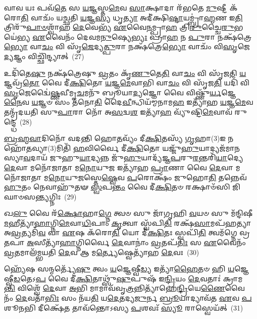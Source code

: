 𑌵𑌾𑌵 𑌯𑌃 𑌪𑌵᳴\-\ul{𑌤𑍇} 𑌸 \ul{𑌯}\-𑌜𑍍𑌞𑌸𑍍𑌤\-\ul{𑌮𑍇}\-𑌵 \ul{𑌸𑌾}\-𑌕𑍍𑌷𑌾𑌦𑌾 𑌰᳴𑌭𑌤𑍇 \ul{𑌮𑍁}\-𑌷𑍍𑌟𑍀 𑌕᳴𑌰𑍋\-\ul{𑌤𑌿} 𑌵𑌾𑌚𑌂᳴ 𑌯𑌚𑍍𑌛𑌤𑌿 \ul{𑌯}\-𑌜𑍍𑌞\-\ul{𑌸𑍍𑌯} 𑌧𑍃\-\ul{𑌤𑍍𑌯𑌾} 𑌅𑌦𑍀॑𑌕𑍍𑌷𑌿\-\ul{𑌷𑍍𑌟𑌾}\-𑌯𑌮𑍍𑌬𑍍𑌰𑌾॑\-\ul{𑌹𑍍𑌮}\-𑌣 𑌇\-\ul{𑌤𑌿} 𑌤𑍍𑌰𑌿𑌰𑍁᳴\-\ul{𑌪𑌾}\-\-\ul{𑍞}\-𑌶𑍍𑌵𑌾᳴𑌹 \ul{𑌦𑍇}\-𑌵𑍇𑌭𑍍𑌯᳴ \ul{𑌏}\-𑌵𑍈\-\ul{𑌨}\-𑌮𑍍𑌪𑍍𑌰𑌾\-\ul{𑌹} 𑌤𑍍𑌰𑌿\-\ul{𑌰𑍁}\-𑌚𑍍𑌚𑍈\-\ul{𑌰𑍁}\-𑌭𑌯𑍇॑𑌭𑍍𑌯 \ul{𑌏}\-𑌵𑍈𑌨𑌂᳴ 𑌦𑍇𑌵𑌮\-\ul{𑌨𑍁}\-𑌷𑍍𑌯𑍇\-\ul{𑌭𑍍𑌯𑌃} 𑌪𑍍𑌰𑌾\-\ul{𑌹} 𑌨 \ul{𑌪𑍁}\-𑌰𑌾 𑌨𑌕𑍍𑌷᳴𑌤𑍍𑌰𑍇\-\ul{𑌭𑍍𑌯𑍋} 𑌵𑌾\-\ul{𑌚𑌂} 𑌵𑌿 𑌸𑍃᳴\-\ul{𑌜𑍇}\-𑌦𑍍𑌯\-\ul{𑌤𑍍𑌪𑍁}\-𑌰𑌾 𑌨𑌕𑍍𑌷᳴𑌤𑍍𑌰𑍇\-\ul{𑌭𑍍𑌯𑍋} 𑌵𑌾𑌚𑌂᳴ 𑌵𑌿\-\ul{𑌸𑍃}\-𑌜𑍇\-\ul{𑌦𑍍𑌯}\-𑌜𑍍𑌞𑌂 𑌵𑌿𑌚𑍍𑌛𑌿᳴𑌨𑍍𑌦𑍍𑌯𑌾𑌤𑍍~(27)

𑌉𑌦𑌿᳴𑌤𑍇\-\ul{𑌷𑍁} 𑌨𑌕𑍍𑌷᳴𑌤𑍍𑌰𑍇𑌷𑍁 \ul{𑌵𑍍𑌰}\-𑌤𑌂 𑌕𑍃᳴\-\ul{𑌣𑍁}\-𑌤𑍇\-\ul{𑌤𑌿} 𑌵𑌾\-\ul{𑌚𑌂} 𑌵𑌿 𑌸𑍃᳴𑌜𑌤𑌿 \ul{𑌯}\-𑌜𑍍𑌞𑌵𑍍𑌰᳴\-\ul{𑌤𑍋} 𑌵𑍈 𑌦𑍀॑\-\ul{𑌕𑍍𑌷𑌿}\-𑌤𑍋 \ul{𑌯}\-𑌜𑍍𑌞\-\ul{𑌮𑍇}\-𑌵𑌾𑌭𑌿 𑌵𑌾\-\ul{𑌚𑌂} 𑌵𑌿 𑌸𑍃᳴𑌜\-\ul{𑌤𑌿} 𑌯𑌦𑌿᳴ 𑌵𑌿\-\ul{𑌸𑍃}\-𑌜𑍇𑌦𑍍𑌵𑍈॑\-\ul{𑌷𑍍𑌣}\-𑌵𑍀𑌮𑍃\-\ul{𑌚}\-𑌮𑌨𑍁᳴ 𑌬𑍍𑌰𑍂𑌯𑌾\-\ul{𑌦𑍍𑌯}\-𑌜𑍍𑌞𑍋 𑌵𑍈 𑌵𑌿𑌷𑍍𑌣𑍁᳴\-\ul{𑌰𑍍𑌯}\-𑌜𑍍𑌞𑍇\-\ul{𑌨𑍈}\-𑌵 \ul{𑌯}\-𑌜𑍍𑌞𑍞 𑌸𑌂 𑌤᳴𑌨𑍋\-\ul{𑌤𑌿} 𑌦𑍈\-\ul{𑌵𑍀}\-𑌨𑍍𑌧𑌿𑌯᳴𑌮𑍍𑌮𑌨𑌾𑌮\-\ul{𑌹} 𑌇𑌤𑍍𑌯𑌾᳴𑌹 \ul{𑌯}\-𑌜𑍍𑌞\-\ul{𑌮𑍇}\-𑌵 𑌤𑌨𑍍𑌮𑍍𑌰᳴𑌦𑌯𑌤𑌿 𑌸𑍁\-\ul{𑌪𑌾}\-𑌰𑌾 𑌨𑍋᳴ 𑌅\-\ul{𑌸}\-𑌦𑍍𑌵\-\ul{𑌶} 𑌇𑌤𑍍𑌯𑌾᳴\-\ul{𑌹} 𑌵𑍍𑌯𑍁᳴𑌷𑍍𑌟𑌿\-\ul{𑌮𑍇}\-𑌵𑌾𑌵᳴ 𑌰𑍁𑌨𑍍𑌦𑍍𑌧𑍇~(28)

\-\ul{𑌬𑍍𑌰}\-\-\ul{𑌹𑍍𑌮}\-\-\ul{𑌵𑌾}\-𑌦𑌿𑌨𑍋᳴ 𑌵𑌦𑌨𑍍𑌤𑌿 𑌹𑍋\-\ul{𑌤}\-𑌵𑍍𑌯𑌂᳴ 𑌦𑍀\-\ul{𑌕𑍍𑌷𑌿}\-𑌤𑌸𑍍𑌯᳴ \ul{𑌗𑍃}\-𑌹𑌾(3)𑌇 𑌨 𑌹𑍋᳴\-\ul{𑌤}\-𑌵𑍍𑌯𑌾(3)𑌮𑌿𑌤𑌿᳴ \ul{𑌹}\-𑌵𑌿𑌰𑍍𑌵𑍈 𑌦𑍀॑\-\ul{𑌕𑍍𑌷𑌿}\-𑌤𑍋 𑌯𑌜𑍍𑌜𑍁᳴\-\ul{𑌹𑍁}\-𑌯𑌾𑌦𑍍𑌯𑌜᳴𑌮𑌾𑌨𑌸𑍍𑌯𑌾\-\ul{𑌵}\-𑌦𑌾𑌯᳴ 𑌜𑍁𑌹𑍁\-\ul{𑌯𑌾}\-𑌦𑍍𑌯𑌨𑍍𑌨 𑌜𑍁᳴\-\ul{𑌹𑍁}\-𑌯𑌾𑌦𑍍𑌯᳴𑌜𑍍𑌞\-\ul{𑌪}\-𑌰𑍁\-\ul{𑌰}\-𑌨𑍍𑌤𑌰𑌿᳴\-\ul{𑌯𑌾}\-𑌦𑍍𑌯𑍇 \ul{𑌦𑍇}\-𑌵𑌾 𑌮𑌨𑍋᳴𑌜𑌾𑌤𑌾 𑌮\-\ul{𑌨𑍋}\-𑌯𑍁\-\ul{𑌜} 𑌇𑌤𑍍𑌯𑌾᳴𑌹 \ul{𑌪𑍍𑌰𑌾}\-𑌣𑌾 𑌵𑍈 \ul{𑌦𑍇}\-𑌵𑌾 𑌮𑌨𑍋᳴𑌜𑌾𑌤𑌾 𑌮\-\ul{𑌨𑍋}\-𑌯𑍁\-\ul{𑌜}\-𑌸𑍍𑌤𑍇\-\ul{𑌷𑍍𑌵𑍇}\-𑌵 \ul{𑌪}\-𑌰𑍋𑌕𑍍𑌷𑌂᳴ 𑌜𑍁𑌹𑍋\-\ul{𑌤𑌿} 𑌤𑌨𑍍𑌨𑍇𑌵᳴ \ul{𑌹𑍁}\-𑌤𑌂 𑌨𑍇𑌵𑌾𑌹𑍁᳴𑌤𑍟 \ul{𑌸𑍍𑌵}\-𑌪\-\ul{𑌨𑍍𑌤𑌂} 𑌵𑍈 𑌦𑍀॑\-\ul{𑌕𑍍𑌷𑌿}\-𑌤𑍞 𑌰𑌕𑍍𑌷𑌾𑍞᳴𑌸𑌿 𑌜𑌿𑌘𑌾𑍞𑌸\-\ul{𑌨𑍍𑌤𑍍𑌯}\-𑌗𑍍𑌨𑌿𑌃~(29)

𑌖\-\ul{𑌲𑍁} 𑌵𑍈 𑌰᳴\-\ul{𑌕𑍍𑌷𑍋}\-𑌹𑌾\-\ul{𑌗𑍍𑌨𑍇} 𑌤𑍍𑌵𑍞 𑌸𑍁 𑌜𑌾᳴𑌗𑍃𑌹𑌿 \ul{𑌵}\-𑌯𑍞 𑌸𑍁 𑌮᳴𑌨𑍍𑌦𑌿𑌷𑍀\-\ul{𑌮}\-𑌹𑍀𑌤𑍍𑌯𑌾᳴\-\ul{𑌹𑌾}\-𑌗𑍍𑌨𑌿\-\ul{𑌮𑍇}\-𑌵𑌾\-\ul{𑌧𑌿}\-𑌪𑌾𑌂 \ul{𑌕𑍃}\-𑌤𑍍𑌵𑌾 𑌸𑍍𑌵᳴𑌪𑌿\-\ul{𑌤𑌿} 𑌰𑌕𑍍𑌷᳴\-\ul{𑌸𑌾}\-𑌮𑌪᳴𑌹𑌤𑍍𑌯𑌾 𑌅\-\ul{𑌵𑍍𑌰}\-𑌤𑍍𑌯𑌮𑌿᳴\-\ul{𑌵} 𑌵𑌾 \ul{𑌏}\-𑌷 𑌕᳴𑌰𑍋\-\ul{𑌤𑌿} 𑌯𑍋 𑌦𑍀॑\-\ul{𑌕𑍍𑌷𑌿}\-𑌤𑌃 𑌸𑍍𑌵𑌪𑌿᳴\-\ul{𑌤𑌿} 𑌤𑍍𑌵𑌮᳴𑌗𑍍𑌨𑍇 𑌵𑍍𑌰\-\ul{𑌤}\-𑌪𑌾 \ul{𑌅}\-𑌸𑍀𑌤𑍍𑌯𑌾᳴\-\ul{𑌹𑌾}\-𑌗𑍍𑌨𑌿𑌰𑍍𑌵𑍈 \ul{𑌦𑍇}\-𑌵𑌾𑌨𑌾𑌂॑ \ul{𑌵𑍍𑌰}\-𑌤𑌪᳴\-\ul{𑌤𑌿𑌃} 𑌸 \ul{𑌏}\-𑌵𑍈𑌨𑌂᳴ \ul{𑌵𑍍𑌰}\-𑌤𑌮𑌾𑌲᳴𑌮𑍍𑌭𑌯𑌤𑌿 \ul{𑌦𑍇}\-𑌵 𑌆 𑌮\-\ul{𑌰𑍍𑌤𑍍𑌯𑍇}\-𑌷𑍍𑌵𑍇𑌤𑍍𑌯𑌾᳴𑌹 \ul{𑌦𑍇}\-𑌵𑌃~(30)

𑌹𑍍𑌯𑍇᳴𑌷 𑌸𑌨𑍍𑌮𑌰𑍍𑌤𑍍𑌯𑍇᳴\-\ul{𑌷𑍁} 𑌤𑍍𑌵𑌂 \ul{𑌯}\-𑌜𑍍𑌞𑍇𑌷𑍍𑌵𑍀\-\ul{𑌡𑍍𑌯} 𑌇𑌤𑍍𑌯𑌾᳴\-\ul{𑌹𑍈}\-𑌤𑍞 𑌹𑌿 \ul{𑌯}\-𑌜𑍍𑌞𑍇𑌷𑍍𑌵𑍀\-\ul{𑌡}\-𑌤𑍇\-𑌽\-\ul{𑌪} 𑌵𑍈 𑌦𑍀॑\-\ul{𑌕𑍍𑌷𑌿}\-𑌤𑌾𑌥𑍍𑌸𑍁᳴\-\ul{𑌷𑍁}\-𑌪𑍁𑌷᳴ 𑌇\-\ul{𑌨𑍍𑌦𑍍𑌰𑌿}\-𑌯𑌂 \ul{𑌦𑍇}\-𑌵𑌤𑌾𑌃॑ 𑌕𑍍𑌰𑌾𑌮\-\ul{𑌨𑍍𑌤𑌿} 𑌵𑌿𑌶𑍍𑌵𑍇᳴ \ul{𑌦𑍇}\-𑌵𑌾 \ul{𑌅}\-𑌭𑌿 𑌮𑌾𑌮𑌾𑌵᳴𑌵𑍃\-\ul{𑌤𑍍𑌰}\-𑌨𑍍𑌨𑌿𑌤𑍍𑌯𑌾᳴𑌹𑍇\-\ul{𑌨𑍍𑌦𑍍𑌰𑌿}\-𑌯𑍇\-\ul{𑌣𑍈}\-𑌵𑍈𑌨𑌂᳴ \ul{𑌦𑍇}\-𑌵𑌤𑌾᳴\-\ul{𑌭𑌿𑌃} 𑌸𑌂 𑌨᳴𑌯\-\ul{𑌤𑌿} 𑌯\-\ul{𑌦𑍇}\-𑌤𑌦𑍍𑌯\-\ul{𑌜𑍁}\-𑌰𑍍𑌨 \ul{𑌬𑍍𑌰𑍂}\-𑌯𑌾𑌦𑍍𑌯𑌾𑌵᳴𑌤 \ul{𑌏}\-𑌵 \ul{𑌪}\-𑌶𑍂\-\ul{𑌨}\-𑌭𑌿 𑌦𑍀𑌕𑍍𑌷𑍇᳴\-\ul{𑌤} 𑌤𑌾𑌵᳴𑌨𑍍𑌤𑍋\-𑌽𑌸𑍍𑌯 \ul{𑌪}\-𑌶𑌵𑌃᳴ \ul{𑌸𑍍𑌯𑍂} 𑌰𑌾𑌸𑍍𑌵𑍇𑌯᳴𑌤𑍍~(31)

